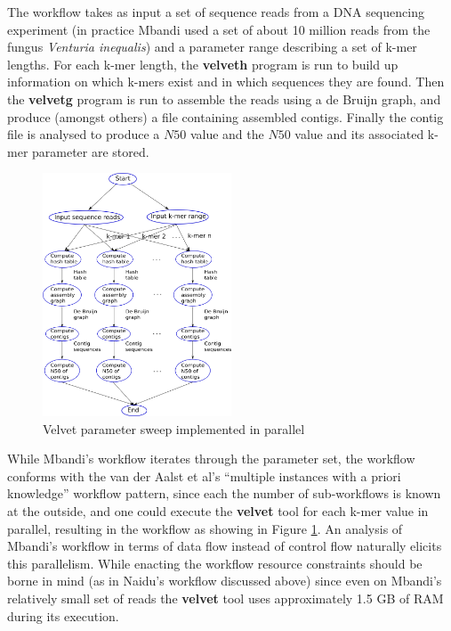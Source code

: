\documentclass[a4paper,10pt]{scrreprt}
\begin{document}
The workflow takes as input a set of sequence reads from a DNA sequencing experiment (in practice Mbandi used a set of about 10 million reads from the fungus \emph{Venturia inequalis}) and a parameter range describing a set of k-mer lengths. For each k-mer length, the \textbf{velveth} program is run to build up information on which k-mers exist and in which sequences they are found. Then the \textbf{velvetg} program is run to assemble the reads using a de Bruijn graph, and produce (amongst others) a file containing assembled contigs. Finally the contig file is analysed to produce a $N50$ value and the $N50$ value and its associated k-mer parameter are stored.

\begin{figure}[!htb]
\centering
\includegraphics[width=0.5\textwidth]{images/ComputeVelvetAlignments}
\caption{Velvet parameter sweep implemented in parallel}
\label{fig:ComputeVelvetAlignments}
\end{figure}

While Mbandi's workflow iterates through the parameter set, the workflow conforms with the van der Aalst et al's ``multiple instances with a priori knowledge'' workflow pattern, since each the number of sub-workflows is known at the outside, and one could execute the \textbf{velvet} tool for each k-mer value in parallel, resulting in the workflow as showing in Figure \ref{fig:ComputeVelvetAlignments}. An analysis of Mbandi's workflow in terms of data flow instead of control flow naturally elicits this parallelism. While enacting the workflow resource constraints should be borne in mind (as in Naidu's workflow discussed above) since even on Mbandi's relatively small set of reads the \textbf{velvet} tool uses approximately 1.5 GB of RAM during its execution.
\end{document}
